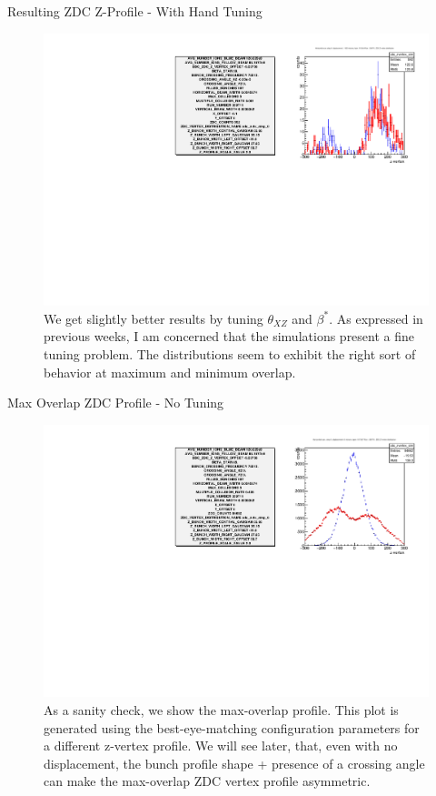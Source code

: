 \begin{frame}{Resulting ZDC Z-Profile - With Hand Tuning}
\begin{figure}
\begin{center}
\includegraphics[width=0.8\linewidth]{../ExploringZProfile/figs/359711_step_0_zvertex_compare_tuned.pdf}
\end{center}
\caption{We get slightly better results by tuning $\theta_{XZ}$ and $\beta^{*}$.
	As expressed in previous weeks, I am concerned that the simulations present a
	fine tuning problem. The distributions seem to exhibit the right sort of
behavior at maximum and minimum overlap.}
\label{fig:359711_step_0_zvertex_compare_tuned}
\end{figure}
\end{frame}

\begin{frame}{Max Overlap ZDC Profile - No Tuning}
\begin{figure}
\begin{center}
\includegraphics[width=0.8\linewidth]{../ExploringZProfile/figs/359711_step_6_zvertex_compare.pdf}
\end{center}
\caption{
	As a sanity check, we show the max-overlap profile. This plot is generated
	using the best-eye-matching configuration parameters for a different z-vertex
	profile. We will see later, that, even with no displacement, the bunch profile
	shape + presence of a crossing angle can make the max-overlap ZDC vertex
	profile asymmetric.
}
\label{fig:359711_step_6_zvertex_compare}
\end{figure}
\end{frame}


